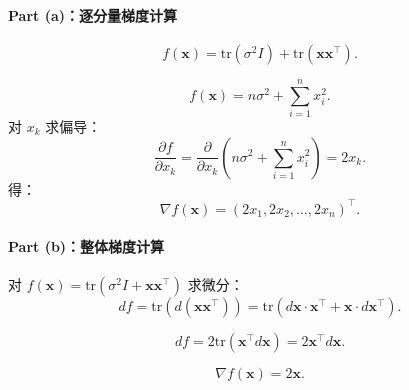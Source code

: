 \paragraph{Part (a)：逐分量梯度计算}  
\[
f(\bm{x}) = \text{tr}(\sigma^2 I) + \text{tr}(\bm{x}\bm{x}^\top).
\]

\[
f(\bm{x}) = n\sigma^2 + \sum_{i=1}^n x_i^2.
\]
对 \( x_k \) 求偏导：
\[
\frac{\partial f}{\partial x_k} = \frac{\partial}{\partial x_k} \left( n\sigma^2 + \sum_{i=1}^n x_i^2 \right) = 2x_k.
\]
得：
\[
\boxed{\nabla f(\bm{x}) = \left( 2x_1, 2x_2, \dots, 2x_n \right)^\top}.
\]

\paragraph{Part (b)：整体梯度计算}  
对 \( f(\bm{x}) = \text{tr}(\sigma^2 I + \bm{x}\bm{x}^\top) \) 求微分：
\[
df = \text{tr}(d(\bm{x}\bm{x}^\top)) = \text{tr}(d\bm{x} \cdot \bm{x}^\top + \bm{x} \cdot d\bm{x}^\top).
\]

\[
df = 2\text{tr}(\bm{x}^\top d\bm{x}) = 2\bm{x}^\top d\bm{x}.
\]

\[
\boxed{\nabla f(\bm{x}) = 2\bm{x}}.
\]